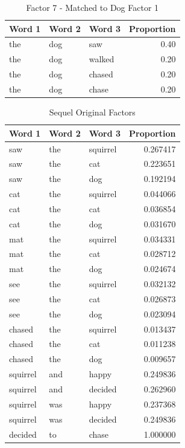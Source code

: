 \documentclass[../ut-dissertation.tex]{subfiles}
\begin{document}
\begin{table}[p]
  \centering
  \caption{Factor 7 - Matched to Dog Factor 1}\label{tab:dogfactor}
  \begin{tabular}{|lll|r|}
    \hline
    Word 1 & Word 2 & Word 3 & Proportion\\
    \hline
    the & dog & saw & 0.40\\
    the & dog & walked & 0.20\\
    the & dog & chased & 0.20\\
    the & dog & chase & 0.20\\
    \hline
  \end{tabular}
\end{table}

\begin{table}[p]
  \centering
  \caption{Sequel Original Factors}\label{tab:sequel_original}
  \begin{tabular}{|lll|r|}
    \hline
    Word 1 & Word 2 & Word 3 & Proportion \\
    \hline
    saw & the & squirrel & 0.267417\\
    saw & the & cat & 0.223651\\
    saw & the & dog & 0.192194\\
    cat & the & squirrel & 0.044066\\
    cat & the & cat & 0.036854\\
    cat & the & dog & 0.031670\\
    mat & the & squirrel & 0.034331\\
    mat & the & cat & 0.028712\\
    mat & the & dog & 0.024674\\
    see & the & squirrel & 0.032132\\
    see & the & cat & 0.026873\\
    see & the & dog & 0.023094\\
    chased & the & squirrel & 0.013437\\
    chased & the & cat & 0.011238\\
    chased & the & dog & 0.009657\\
    \hline
    squirrel & and & happy & 0.249836\\
    squirrel & and & decided & 0.262960\\
    squirrel & was & happy & 0.237368\\
    squirrel & was & decided & 0.249836\\
    \hline
    decided & to & chase & 1.000000\\

\end{tabular}
\end{table}
\end{document}
